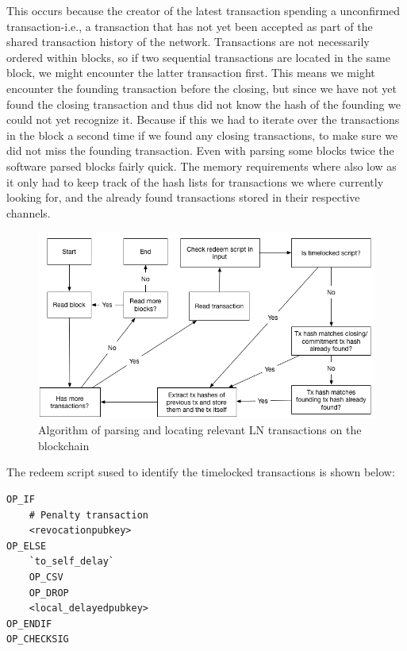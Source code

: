 This occurs because the creator of the latest transaction spending a unconfirmed transaction-i.e., a transaction that has not yet been accepted as part of the shared transaction history of the network. 
Transactions are not necessarily ordered within blocks, so if two sequential transactions are located in the same block, we might encounter the latter transaction first. This means we might encounter the founding transaction before the closing, but since we have not yet found the closing transaction and thus did not know the hash of the founding we could not yet recognize it. Because if this we had to iterate over the transactions in the block a second time if we found any closing transactions, to make sure we did not miss the founding transaction.
Even with parsing some blocks twice the software parsed blocks fairly quick. The memory requirements where also low as it only had to keep track of the hash lists for transactions we where currently looking for, and the already found transactions stored in their respective channels. 

\begin{figure}[h]
    \centering
    \includegraphics[width=12cm]{figures/algo_v2.png}
    \caption{Algorithm of parsing and locating relevant LN transactions on the blockchain}
    \label{fig:algo}
\end{figure}


The redeem script sused to identify the timelocked transactions is shown below: \cite{bolt3}

\begin{verbatim}
OP_IF
    # Penalty transaction
    <revocationpubkey>
OP_ELSE
    `to_self_delay`
    OP_CSV
    OP_DROP
    <local_delayedpubkey>
OP_ENDIF
OP_CHECKSIG
\end{verbatim}


